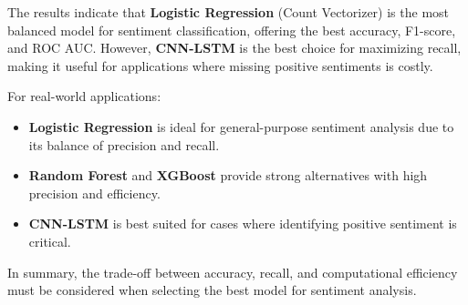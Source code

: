 The results indicate that \textbf{Logistic Regression} (Count Vectorizer) is the most balanced model for sentiment classification, offering the best accuracy, F1-score, and ROC AUC. However, \textbf{CNN-LSTM} is the best choice for maximizing recall, making it useful for applications where missing positive sentiments is costly. 

For real-world applications:
\begin{itemize}
    \item \textbf{Logistic Regression} is ideal for general-purpose sentiment analysis due to its balance of precision and recall.
    \item \textbf{Random Forest} and \textbf{XGBoost} provide strong alternatives with high precision and efficiency.
    \item \textbf{CNN-LSTM} is best suited for cases where identifying positive sentiment is critical.
\end{itemize}

In summary, the trade-off between accuracy, recall, and computational efficiency must be considered when selecting the best model for sentiment analysis.

\newpage
